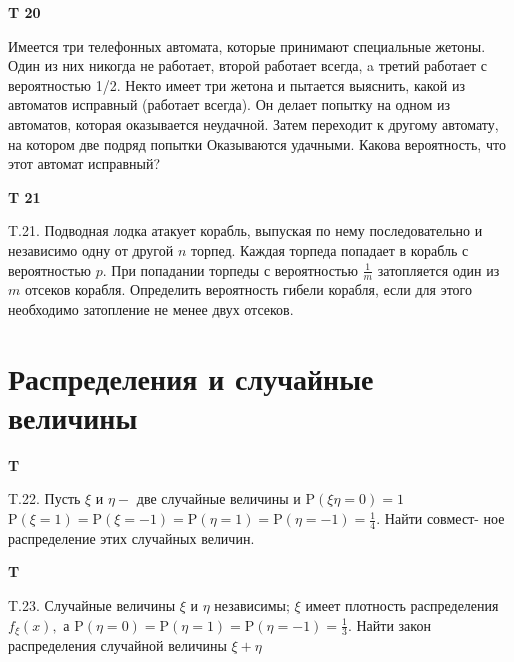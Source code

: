 \documentclass[a4paper,12pt]{article} %
\begin{document}
\begin{example}\textbf{T 20}

Имеется три телефонных автомата, которые принимают специальные жетоны. 
Один из них никогда не работает, второй работает всегда, a третий работает с вероятностью 1/2. 
Некто имеет три жетона и пытается выяснить, какой из автоматов исправный (работает всегда). Он
делает попытку на одном из автоматов, которая оказывается неудачной.
Затем переходит к другому автомату, на котором две подряд попытки
Оказываются удачными. Какова вероятность, что этот автомат исправный?


\end{example}





\begin{example}\textbf{T 21}

T.21. Подводная лодка атакует корабль, выпуская по нему последовательно и независимо одну от другой $n$ торпед. Каждая торпеда попадает в корабль с вероятностью $p .$ При попадании торпеды с вероятностью $\frac{1}{m}$ затопляется один из $m$ отсеков корабля. Определить вероятность гибели корабля, если для этого необходимо затопление не менее двух отсеков.


\end{example}



\section{Распределения и случайные величины}


\begin{example}\textbf{T}

T.22. Пусть $\xi$ и $\eta-$ две случайные величины и $\mathrm{P}(\xi \eta=0)=1$ $\mathrm{P}(\xi=1)=\mathrm{P}(\xi=-1)=\mathrm{P}(\eta=1)=\mathrm{P}(\eta=-1)=\frac{1}{4} .$ Найти совмест-
ное распределение этих случайных величин.


\end{example}


\begin{example}\textbf{T}

T.23. Случайные величины $\xi$ и $\eta$ независимы; $\xi$ имеет плотность распределения $f_{\xi}(x),$ а $\mathrm{P}(\eta=0)=\mathrm{P}(\eta=1)=\mathrm{P}(\eta=-1)=\frac{1}{3} .$ Найти закон
распределения случайной величины $\xi+\eta$


\end{example}
\end{document}
